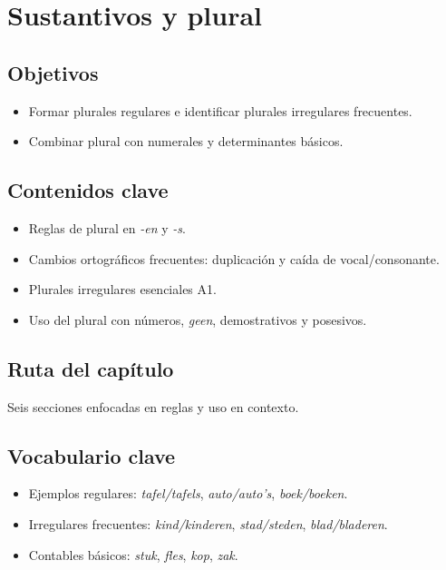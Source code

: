 \chapter{Sustantivos y plural}
\section{Objetivos}
\begin{itemize}[leftmargin=*]
	\item Formar plurales regulares e identificar plurales irregulares frecuentes.
	\item Combinar plural con numerales y determinantes básicos.
\end{itemize}

\section{Contenidos clave}
\begin{itemize}[leftmargin=*]
	\item Reglas de plural en \textit{-en} y \textit{-s}.
	\item Cambios ortográficos frecuentes: duplicación y caída de vocal/consonante.
	\item Plurales irregulares esenciales A1.
	\item Uso del plural con números, \textit{geen}, demostrativos y posesivos.
\end{itemize}

\section{Ruta del capítulo}
Seis secciones enfocadas en reglas y uso en contexto.








\section{Vocabulario clave}
\begin{itemize}[leftmargin=*]
	\item Ejemplos regulares: \textit{tafel/tafels}, \textit{auto/auto's}, \textit{boek/boeken}.
	\item Irregulares frecuentes: \textit{kind/kinderen}, \textit{stad/steden}, \textit{blad/bladeren}.
	\item Contables básicos: \textit{stuk}, \textit{fles}, \textit{kop}, \textit{zak}.
\end{itemize}

